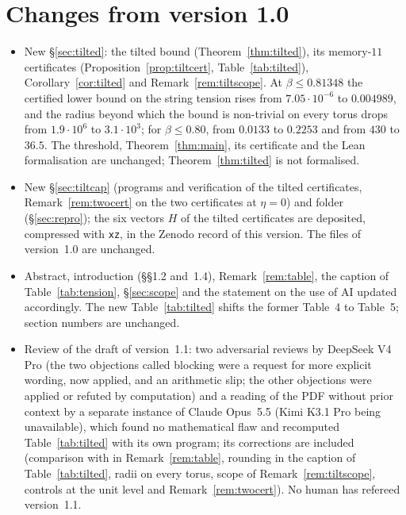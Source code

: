\documentclass[11pt,a4paper]{article}
\theoremstyle{plain}
\theoremstyle{remark}
\numberwithin{equation}{section}
\begin{document}
\section*{Changes from version 1.0}\label{sec:changes}
\begin{itemize}
\item New \S\ref{sec:tilted}: the tilted bound (Theorem~\ref{thm:tilted}), its memory-$11$ certificates
(Proposition~\ref{prop:tiltcert}, Table~\ref{tab:tilted}), Corollary~\ref{cor:tilted} and Remark~\ref{rem:tiltscope}. At
$\beta\le0.81348$ the certified lower bound on the string tension rises from $7.05\cdot10^{-6}$ to $0.004989$, and the radius beyond which
the bound is non-trivial on every torus drops from $1.9\cdot10^{6}$ to $3.1\cdot10^{3}$; for $\beta\le0.80$, from $0.0133$ to $0.2253$ and from
$430$ to $36.5$. The threshold, Theorem~\ref{thm:main}, its certificate and the Lean formalisation are unchanged; Theorem~\ref{thm:tilted}
is not formalised.
\item New \S\ref{sec:tiltcap} (programs and verification of the tilted certificates, Remark~\ref{rem:twocert} on the two certificates at
$\eta=0$) and folder  (\S\ref{sec:repro}); the six vectors $H$ of the tilted certificates are deposited,
compressed with \texttt{xz}, in the Zenodo record of this version. The files of version~1.0 are unchanged.
\item Abstract, introduction (\S\S1.2 and~1.4), Remark~\ref{rem:table}, the caption of Table~\ref{tab:tension}, \S\ref{sec:scope} and the
statement on the use of AI updated accordingly. The new Table~\ref{tab:tilted} shifts the former Table~4 to Table~5; section numbers
are unchanged.
\item Review of the draft of version~1.1: two adversarial reviews by DeepSeek V4 Pro (the two objections called blocking were a request
for more explicit wording, now applied, and an arithmetic slip; the other objections were applied or refuted by computation) and a
reading of the PDF without prior context by a separate instance of Claude Opus~5.5 (Kimi K3.1 Pro being unavailable), which found no
mathematical flaw and recomputed Table~\ref{tab:tilted} with its own program; its corrections are included (comparison with
\cite[Cor.~7.2]{D7} in Remark~\ref{rem:table}, rounding in the caption of Table~\ref{tab:tilted}, radii on every torus, scope of
Remark~\ref{rem:tiltscope}, controls at the unit level and Remark~\ref{rem:twocert}). No human has refereed version~1.1.
\end{itemize}
\end{document}
